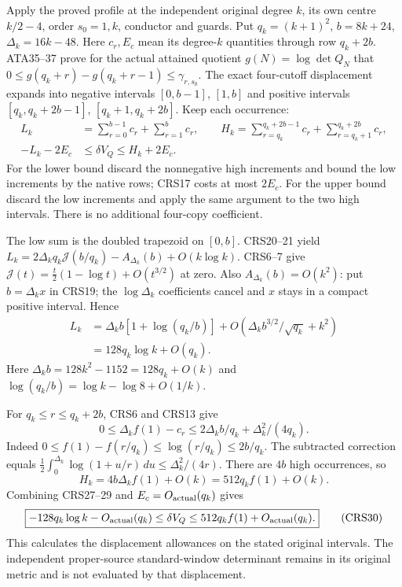 \documentclass[11pt,a4paper]{article}
\begin{document}
Apply the proved profile at the independent original degree $k$,
its own centre $k/2-4$, order $s_0=1,k$, conductor and guards.
Put $q_k=(k+1)^2$, $b=8k+24$, $\Delta_k=16k-48$.
Here $c_r,E_c$ mean its degree-$k$ quantities through row $q_k+2b$.
ATA35--37 prove for the actual attained quotient $g(N)=\log\det Q_N$
that $0\le g(q_k+r)-g(q_k+r-1)\le\gamma_{r,s_0}$.
The exact four-cutoff displacement expands into negative intervals
$[0,b-1]$, $[1,b]$ and positive intervals
$[q_k,q_k+2b-1]$, $[q_k+1,q_k+2b]$. Keep each occurrence:
\[
\begin{split}
 L_k&=\sum_{r=0}^{b-1}c_r+\sum_{r=1}^{b}c_r,\qquad
 H_k=\sum_{r=q_k}^{q_k+2b-1}c_r+
                               \sum_{r=q_k+1}^{q_k+2b}c_r,\\
 -L_k-2E_c&\le\delta V_Q\le H_k+2E_c .
\end{split}                                                    \tag{CRS27}
\]
For the lower bound discard the nonnegative high increments and
bound the low increments by the native rows; CRS17 costs at most
$2E_c$. For the upper bound discard the low increments and apply
the same argument to the two high intervals. There is no additional
four-copy coefficient.

The low sum is the doubled trapezoid on $[0,b]$. CRS20--21 yield
$L_k=2\Delta_kq_k\mathcal J(b/q_k)-A_{\Delta_k}(b)+O(k\log k)$.
CRS6--7 give
$\mathcal J(t)=\tfrac t2(1-\log t)+O(t^{3/2})$ at zero.
Also $A_{\Delta_k}(b)=O(k^2)$: put $b=\Delta_kx$ in CRS19;
the $\log\Delta_k$ coefficients cancel and $x$ stays in a compact
positive interval. Hence
\[
\begin{split}
 L_k&=\Delta_kb[1+\log(q_k/b)]
        +O(\Delta_kb^{3/2}/\sqrt{q_k}+k^2)\\
    &=128q_k\log k+O(q_k).
\end{split}                                                    \tag{CRS28}
\]
Here $\Delta_kb=128k^2-1152=128q_k+O(k)$ and
$\log(q_k/b)=\log k-\log8+O(1/k)$.

For $q_k\le r\le q_k+2b$, CRS6 and CRS13 give
\[
 0\le\Delta_k f(1)-c_r
       \le2\Delta_k b/q_k+\Delta_k^2/(4q_k).
\]
Indeed $0\le f(1)-f(r/q_k)\le\log(r/q_k)\le2b/q_k$.
The subtracted correction equals
$\tfrac12\int_0^{\Delta_k}\log(1+u/r)\,du
\le\Delta_k^2/(4r)$. There are $4b$ high occurrences, so
\[
 H_k=4b\Delta_k f(1)+O(k)=512q_k f(1)+O(k).            \tag{CRS29}
\]
Combining CRS27--29 and $E_c=O_{\rm actual}(q_k)$ gives
\[
 \boxed{-128q_k\log k-O_{\rm actual}(q_k)
       \le\delta V_Q\le512q_k f(1)+O_{\rm actual}(q_k).}\tag{CRS30}
\]
This calculates the displacement allowances on the stated original
intervals. The independent proper-source standard-window determinant
remains in its original metric and is not evaluated by that displacement.
\end{document}
